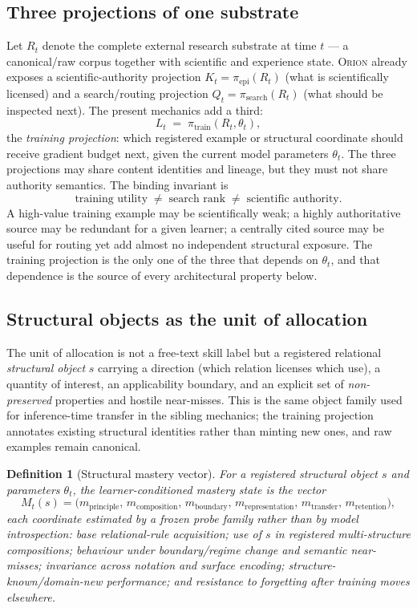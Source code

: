 \documentclass[11pt]{article}
\newtheorem{definition}{Definition}
\newcommand{\RAKL}{\textsc{Orion}}
\begin{document}
\subsection{Three projections of one substrate}
Let $R_t$ denote the complete external research substrate at time $t$ --- a canonical/raw corpus together with scientific and experience state. \RAKL{} already exposes a scientific-authority projection $K_t=\pi_{\mathrm{epi}}(R_t)$ (what is scientifically licensed) and a search/routing projection $Q_t=\pi_{\mathrm{search}}(R_t)$ (what should be inspected next). The present mechanics add a third:
\[
L_t \;=\; \pi_{\mathrm{train}}(R_t,\theta_t),
\]
the \emph{training projection}: which registered example or structural coordinate should receive gradient budget next, given the current model parameters $\theta_t$. The three projections may share content identities and lineage, but they must not share authority semantics. The binding invariant is
\[
\text{training utility}\;\neq\;\text{search rank}\;\neq\;\text{scientific authority}.
\]
A high-value training example may be scientifically weak; a highly authoritative source may be redundant for a given learner; a centrally cited source may be useful for routing yet add almost no independent structural exposure. The training projection is the only one of the three that depends on $\theta_t$, and that dependence is the source of every architectural property below.

\subsection{Structural objects as the unit of allocation}
The unit of allocation is not a free-text skill label but a registered relational \emph{structural object} $s$ carrying a direction (which relation licenses which use), a quantity of interest, an applicability boundary, and an explicit set of \emph{non-preserved} properties and hostile near-misses. This is the same object family used for inference-time transfer in the sibling mechanics; the training projection annotates existing structural identities rather than minting new ones, and raw examples remain canonical.

\begin{definition}[Structural mastery vector]
\label{def:mastery}
For a registered structural object $s$ and parameters $\theta_t$, the learner-conditioned mastery state is the vector
\[
M_t(s)=\bigl(m_{\mathrm{principle}},\,m_{\mathrm{composition}},\,m_{\mathrm{boundary}},\,m_{\mathrm{representation}},\,m_{\mathrm{transfer}},\,m_{\mathrm{retention}}\bigr),
\]
each coordinate estimated by a \emph{frozen probe family} rather than by model introspection: base relational-rule acquisition; use of $s$ in registered multi-structure compositions; behaviour under boundary/regime change and semantic near-misses; invariance across notation and surface encoding; structure-known/domain-new performance; and resistance to forgetting after training moves elsewhere.
\end{definition}
\end{document}
